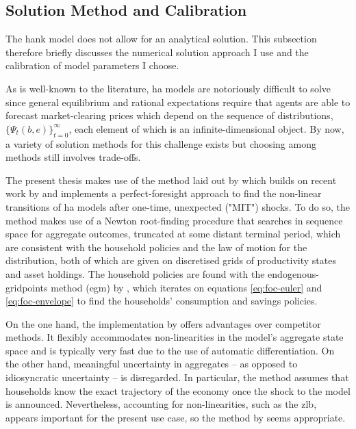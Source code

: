\documentclass[a4paper,12pt]{article} %
\numberwithin{equation}{section} %
\numberwithin{figure}{section}
\numberwithin{table}{section}
\begin{document}
\subsection{Solution Method and Calibration}
\label{sec:model-solution}

The \Gls{hank} model does not allow for an analytical solution. This subsection therefore briefly discusses the numerical solution approach I use and the calibration of model parameters I choose.

As is well-known to the literature, \Gls{ha} models are notoriously difficult to solve since general equilibrium and rational expectations require that agents are able to forecast market-clearing prices which depend on the sequence of distributions, $\{ \Psi_t (b,e) \}_{t=0}^{\infty} $, each element of which is an infinite-dimensional object. By now, a variety of solution methods for this challenge exists but choosing among methods still involves trade-offs. 

The present thesis makes use of the method laid out by \textcite{boehl2023econpizza} which builds on recent work by \textcite{auclert2021} and implements a perfect-foresight approach to find the non-linear transitions of \Gls{ha} models after one-time, unexpected ("MIT") shocks. To do so, the method makes use of a Newton root-finding procedure that searches in sequence space for aggregate outcomes, truncated at some distant terminal period, which are consistent with the household policies and the law of motion for the distribution, both of which are given on discretised grids of productivity states and asset holdings. The household policies are found with the endogenous-gridpoints method (\Gls{egm}) by \textcite{carroll2006}, which iterates on equations \eqref{eq:foc-euler} and \eqref{eq:foc-envelope} to find the households' consumption and savings policies.

On the one hand, the implementation by \textcite{boehl2023econpizza} offers advantages over competitor methods. It flexibly accommodates non-linearities in the model's aggregate state space and is typically very fast due to the use of automatic differentiation. On the other hand, meaningful uncertainty in aggregates -- as opposed to idiosyncratic uncertainty -- is disregarded. In particular, the method assumes that households know the exact trajectory of the economy once the shock to the model is announced. Nevertheless, accounting for non-linearities, such as the \Gls{zlb}, appears important for the present use case, so the method by \textcite{boehl2023econpizza} seems appropriate.
\end{document}
